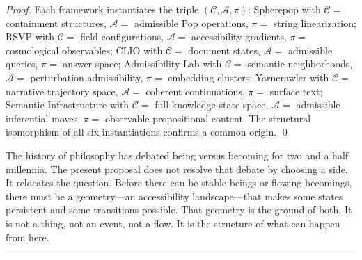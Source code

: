 \documentclass[12pt, a4paper, twoside]{article}
\theoremstyle{plain}
\theoremstyle{definition}
\theoremstyle{remark}
\newcommand{\Acc}{\mathcal{A}}
\newcommand{\Conf}{\mathcal{C}}
\newcommand{\Proj}{\pi}
\begin{document}
\begin{proof}
Each framework instantiates the triple $(\Conf, \Acc, \Proj)$: Spherepop with
$\Conf = $ containment structures, $\Acc = $ admissible Pop operations,
$\Proj = $ string linearization; RSVP with $\Conf = $ field configurations,
$\Acc = $ accessibility gradients, $\Proj = $ cosmological observables; CLIO
with $\Conf = $ document states, $\Acc = $ admissible queries, $\Proj = $
answer space; Admissibility Lab with $\Conf = $ semantic neighborhoods,
$\Acc = $ perturbation admissibility, $\Proj = $ embedding clusters;
Yarncrawler with $\Conf = $ narrative trajectory space, $\Acc = $ coherent
continuations, $\Proj = $ surface text; Semantic Infrastructure with
$\Conf = $ full knowledge-state space, $\Acc = $ admissible inferential moves,
$\Proj = $ observable propositional content. The structural isomorphism of all
six instantiations confirms a common origin.
\qed
\end{proof}

The history of philosophy has debated being versus becoming for two and a half
millennia. The present proposal does not resolve that debate by choosing a
side. It relocates the question. Before there can be stable beings or flowing
becomings, there must be a geometry---an accessibility landscape---that makes
some states persistent and some transitions possible. That geometry is the
ground of both. It is not a thing, not an event, not a flow. It is the
structure of what can happen from here.

\bigskip
\noindent\rule{\textwidth}{0.4pt}
\smallskip
{}
\end{document}
